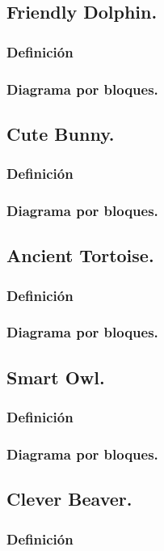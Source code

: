   \subsection{Friendly Dolphin.}
   	\subsubsection{Definición}
	\subsubsection{Diagrama por bloques.}
  \subsection{Cute Bunny.}
  	\subsubsection{Definición}
  	\subsubsection{Diagrama por bloques.}
  \subsection{Ancient Tortoise.}
  	\subsubsection{Definición}
  	\subsubsection{Diagrama por bloques.}
  \subsection{Smart Owl.}
  	\subsubsection{Definición}
  	\subsubsection{Diagrama por bloques.}
  \subsection{Clever Beaver.}
  	\subsubsection{Definición}
